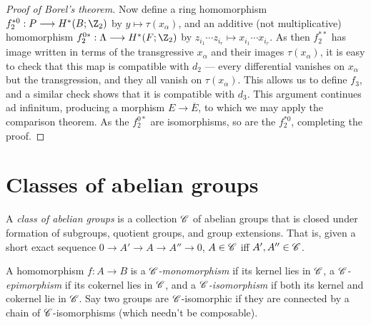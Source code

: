\documentclass[11pt]{article}
\begin{document}
{\begin{proof}[Proof of Borel's theorem]
Now define a ring homomorphism $f_2^{*0}:P\to H^*(B;\Z_2)$ by $y\mapsto \tau(x_\alpha)$, and an additive (not multiplicative) homomorphism $f_2^{0*}:\Lambda\to H^*(F;\Z_2)$ by $z_{i_1}\cdots z_{i_r}\mapsto x_{i_1}\cdots x_{i_r}$. As then $f_2^{**}$ has image written in terms of the transgressive $x_\alpha$ and their images $\tau(x_\alpha)$, it is easy to check that this map is compatible with $d_2$ --- every differential vanishes on $x_\alpha$ but the transgression, and they all vanish on $\tau(x_\alpha)$. This allows us to define $f_3$, and a similar check shows that it is compatible with $d_3$. This argument continues ad infinitum, producing a morphism $E\to\overline E$, to which we may apply the comparison theorem. As the $f_2^{0*}$ are isomorphisms, so are the $f_2^{*0}$, completing the proof.
%
%
\end{proof}

\section{Classes of abelian groups}
A \emph{class of abelian groups} is a collection $\mathscr{C}$ of abelian groups that is closed under formation of subgroups, quotient groups, and group extensions. That is, given a short exact sequence $0\to A'\to A\to A''\to0$, $A\in\mathscr{C}$ iff $A',A''\in\mathscr{C}$.

A homomorphism $f:A\to B$ is a \emph{$\mathscr{C}$-monomorphism} if its kernel lies in $\mathscr{C}$, a \emph{$\mathscr{C}$-epimorphism} if its cokernel lies in $\mathscr{C}$, and a \emph{$\mathscr{C}$-isomorphism} if both its kernel and cokernel lie in $\mathscr{C}$. Say two groups are $\mathscr{C}$-isomorphic if they are connected by a chain of $\mathscr{C}$-isomorphisms (which needn't be composable).

}
\end{document}
